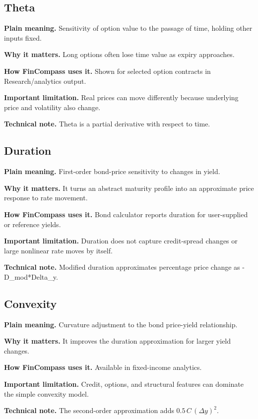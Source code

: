 \documentclass[11pt]{article}
\begin{document}
\subsection{Theta}
\textbf{Plain meaning.} Sensitivity of option value to the passage of time, holding other inputs fixed.

\textbf{Why it matters.} Long options often lose time value as expiry approaches.

\textbf{How FinCompass uses it.} Shown for selected option contracts in Research/analytics output.

\textbf{Important limitation.} Real prices can move differently because underlying price and volatility also change.

\textbf{Technical note.} Theta is a partial derivative with respect to time.

\subsection{Duration}
\textbf{Plain meaning.} First-order bond-price sensitivity to changes in yield.

\textbf{Why it matters.} It turns an abstract maturity profile into an approximate price response to rate movement.

\textbf{How FinCompass uses it.} Bond calculator reports duration for user-supplied or reference yields.

\textbf{Important limitation.} Duration does not capture credit-spread changes or large nonlinear rate moves by itself.

\textbf{Technical note.} Modified duration approximates percentage price change as -D\_mod*Delta\_y.

\subsection{Convexity}
\textbf{Plain meaning.} Curvature adjustment to the bond price-yield relationship.

\textbf{Why it matters.} It improves the duration approximation for larger yield changes.

\textbf{How FinCompass uses it.} Available in fixed-income analytics.

\textbf{Important limitation.} Credit, options, and structural features can dominate the simple convexity model.

\textbf{Technical note.} The second-order approximation adds $0.5\,C\,(\Delta y)^2$.
\end{document}
